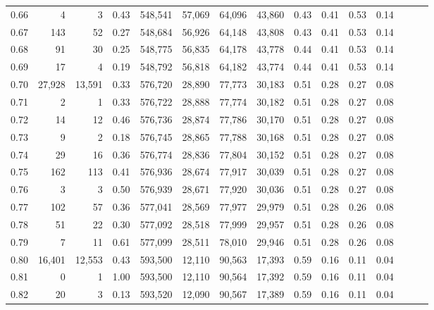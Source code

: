 \begin{tabular}{rrrrrrrrrrrrrrr}
0.66 &       4 &       3 &  0.43 &  548,541 &   57,069 &   64,096 &   43,860 &  0.43 &  0.41 &  0.53 &      0.14 \\
0.67 &     143 &      52 &  0.27 &  548,684 &   56,926 &   64,148 &   43,808 &  0.43 &  0.41 &  0.53 &      0.14 \\
0.68 &      91 &      30 &  0.25 &  548,775 &   56,835 &   64,178 &   43,778 &  0.44 &  0.41 &  0.53 &      0.14 \\
0.69 &      17 &       4 &  0.19 &  548,792 &   56,818 &   64,182 &   43,774 &  0.44 &  0.41 &  0.53 &      0.14 \\
0.70 &  27,928 &  13,591 &  0.33 &  576,720 &   28,890 &   77,773 &   30,183 &  0.51 &  0.28 &  0.27 &      0.08 \\
0.71 &       2 &       1 &  0.33 &  576,722 &   28,888 &   77,774 &   30,182 &  0.51 &  0.28 &  0.27 &      0.08 \\
0.72 &      14 &      12 &  0.46 &  576,736 &   28,874 &   77,786 &   30,170 &  0.51 &  0.28 &  0.27 &      0.08 \\
0.73 &       9 &       2 &  0.18 &  576,745 &   28,865 &   77,788 &   30,168 &  0.51 &  0.28 &  0.27 &      0.08 \\
0.74 &      29 &      16 &  0.36 &  576,774 &   28,836 &   77,804 &   30,152 &  0.51 &  0.28 &  0.27 &      0.08 \\
0.75 &     162 &     113 &  0.41 &  576,936 &   28,674 &   77,917 &   30,039 &  0.51 &  0.28 &  0.27 &      0.08 \\
0.76 &       3 &       3 &  0.50 &  576,939 &   28,671 &   77,920 &   30,036 &  0.51 &  0.28 &  0.27 &      0.08 \\
0.77 &     102 &      57 &  0.36 &  577,041 &   28,569 &   77,977 &   29,979 &  0.51 &  0.28 &  0.26 &      0.08 \\
0.78 &      51 &      22 &  0.30 &  577,092 &   28,518 &   77,999 &   29,957 &  0.51 &  0.28 &  0.26 &      0.08 \\
0.79 &       7 &      11 &  0.61 &  577,099 &   28,511 &   78,010 &   29,946 &  0.51 &  0.28 &  0.26 &      0.08 \\
0.80 &  16,401 &  12,553 &  0.43 &  593,500 &   12,110 &   90,563 &   17,393 &  0.59 &  0.16 &  0.11 &      0.04 \\
0.81 &       0 &       1 &  1.00 &  593,500 &   12,110 &   90,564 &   17,392 &  0.59 &  0.16 &  0.11 &      0.04 \\
0.82 &      20 &       3 &  0.13 &  593,520 &   12,090 &   90,567 &   17,389 &  0.59 &  0.16 &  0.11 &      0.04 \\

\end{tabular}
